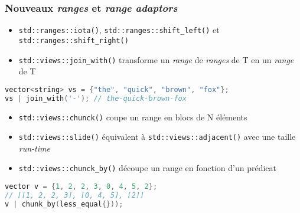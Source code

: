 \documentclass[C++.tex]{subfiles}
\begin{document}
\begin{frame}[fragile]
	\frametitle{Nouveaux \textit{ranges} et \textit{range adaptors}}
	\begin{itemize}
		\item \lstinline|std::ranges::iota()|, \lstinline|std::ranges::shift_left()| et \lstinline|std::ranges::shift_right()|


		\item \lstinline|std::views::join_with()| transforme un \textit{range} de \textit{ranges} de T en un \textit{range} de T
	\end{itemize}

	\begin{lstlisting}[language=C++]
vector<string> vs = {"the", "quick", "brown", "fox"};
vs | join_with('-'); // the-quick-brown-fox\end{lstlisting}

	\begin{itemize}
		\item \lstinline|std::views::chunck()| coupe un range en blocs de N éléments
		\item \lstinline|std::views::slide()| équivalent à \lstinline|std::views::adjacent()| avec une taille  \textit{run-time}
		\item \lstinline|std::views::chunck_by()| découpe un range en fonction d'un prédicat
	\end{itemize}

	\begin{lstlisting}[language=C++]
vector v = {1, 2, 2, 3, 0, 4, 5, 2};
// [[1, 2, 2, 3], [0, 4, 5], [2]]
v | chunk_by(less_equal{}));\end{lstlisting}
\end{frame}
\end{document}
